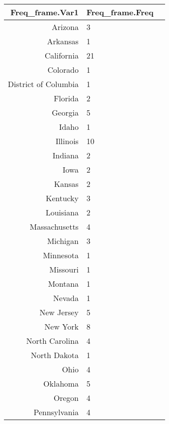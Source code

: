 \documentclass[11pt]{article}
\begin{document}
    \begin{tabular}{r|ll}
 Freq\_frame.Var1 & Freq\_frame.Freq\\
\hline
	 Arizona              &  3                  \\
	 Arkansas             &  1                  \\
	 California           & 21                  \\
	 Colorado             &  1                  \\
	 District of Columbia &  1                  \\
	 Florida              &  2                  \\
	 Georgia              &  5                  \\
	 Idaho                &  1                  \\
	 Illinois             & 10                  \\
	 Indiana              &  2                  \\
	 Iowa                 &  2                  \\
	 Kansas               &  2                  \\
	 Kentucky             &  3                  \\
	 Louisiana            &  2                  \\
	 Massachusetts        &  4                  \\
	 Michigan             &  3                  \\
	 Minnesota            &  1                  \\
	 Missouri             &  1                  \\
	 Montana              &  1                  \\
	 Nevada               &  1                  \\
	 New Jersey           &  5                  \\
	 New York             &  8                  \\
	 North Carolina       &  4                  \\
	 North Dakota         &  1                  \\
	 Ohio                 &  4                  \\
	 Oklahoma             &  5                  \\
	 Oregon               &  4                  \\
	 Pennsylvania         &  4                  \\

\end{tabular}
\end{document}
